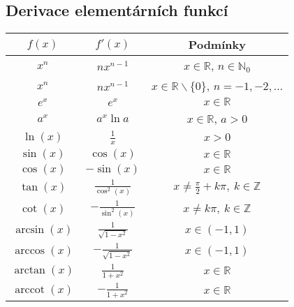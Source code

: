\noindent\begin{minipage}{\linewidth}
    \subsection*{Derivace elementárních funkcí}

    \centering
    \begin{tabular}{|c|c|c|}
        \hline
        \textbf{\( f(x) \)}            & \textbf{\( f'(x) \)}          & \textbf{Podmínky}                                             \\
        \hline
        \( x^n \)                      & \( nx^{n-1} \)                & \( x\in\mathbb{R} \), \( n \in\mathbb{N}_0 \)                   \\
        \( x^n \)                      & \( nx^{n-1} \)                & \( x\in\mathbb{R}\smallsetminus\{0\} \), \( n = -1,-2,\ldots \) \\
        \( e^x \)                      & \( e^x \)                     & \( x\in\mathbb{R} \)                                            \\
        \( a^x \)                      & \( a^x\ln a \)                & \( x\in\mathbb{R} \), \( a>0 \)                                 \\
        \( \ln(x) \)                   & \( \frac{1}{x} \)             & \( x>0 \)                                                       \\
        \( \sin(x) \)                  & \( \cos(x) \)                 & \( x\in\mathbb{R} \)                                            \\
        \( \cos(x) \)                  & \( -\sin(x) \)                & \( x\in\mathbb{R} \)                                            \\
        \( \tan(x) \)                  & \( \frac{1}{\cos^2(x)} \)     & \( x\neq \frac{\pi}{2} + k\pi, \ k\in\mathbb{Z} \)              \\
        \( \cot(x) \)                  & \( -\frac{1}{\sin^2(x)} \)    & \( x\neq k\pi, \ k\in\mathbb{Z} \)                              \\
        \( \arcsin(x) \)               & \( \frac{1}{\sqrt{1-x^2}} \)  & \( x\in(-1,1) \)                                                \\
        \( \arccos(x) \)               & \( -\frac{1}{\sqrt{1-x^2}} \) & \( x\in(-1,1) \)                                                \\
        \( \arctan(x) \)               & \( \frac{1}{1+x^2} \)         & \( x\in\mathbb{R} \)                                            \\
        \( \operatorname{arccot}(x) \) & \( -\frac{1}{1+x^2} \)        & \( x\in\mathbb{R} \)                                            \\
        \hline
    \end{tabular}

\end{minipage}

\pagebreak